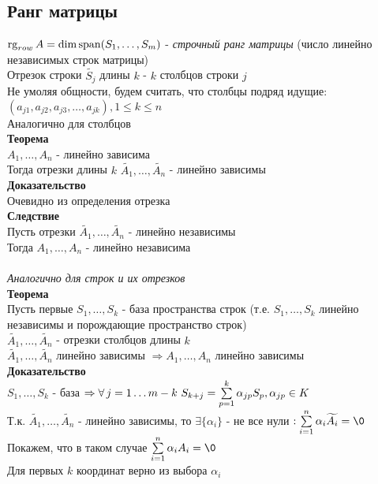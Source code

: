 \documentclass[12pt]{article}
\begin{document}
\subsection{Ранг матрицы}
$\operatorname{rg}_{row} A = \dim \operatorname{span} (S_1,\ldots,S_m)$ - \textit{строчный ранг матрицы} (число линейно независимых строк матрицы)\\
Отрезок строки $\widetilde{S_j}$ длины $k$ - $k$ столбцов строки $j$\\
Не умоляя общности, будем считать, что столбцы подряд идущие: $(a_{j1}, a_{j2}, a_{j3},\ldots,a_{jk}), 1\leq k \leq n$\\
Аналогично для столбцов\\
\textbf{Теорема}\\
$A_1,\ldots,A_n$ - линейно зависима\\
Тогда отрезки длины $k$ $\widetilde{A_1}, \ldots, \widetilde{A_n}$ - линейно зависимы\\
\textbf{Доказательство}\\
Очевидно из определения отрезка\\
\textbf{Следствие}\\
Пусть отрезки $\widetilde{A_1}, \ldots, \widetilde{A_n}$ - линейно независимы\\
Тогда $A_1,\ldots,A_n$ - линейно независима\\\\
\textit{Аналогично для строк и их отрезков}\\
\textbf{Теорема}\\
Пусть первые $S_1, \ldots, S_k$ - база пространства строк (т.е. $S_1,\ldots, S_k$ линейно независимы и порождающие пространство строк)\\
$\widetilde{A_1}, \ldots, \widetilde{A_n}$ - отрезки столбцов длины $k$\\
$\widetilde{A_1}, \ldots, \widetilde{A_n}$ линейно зависимы $\Rightarrow A_1, \ldots, A_n$ линейно зависимы\\
\textbf{Доказательство}\\
$S_1, \ldots, S_k$ - база $\Rightarrow \forall\,j=1\ldots m-k\ S_{k+j} = \suml_{p=1}^k \alpha_{jp}S_p, \alpha_{jp} \in K$\\
Т.к. $\widetilde{A_1}, \ldots, \widetilde{A_n}$ - линейно зависимы, то $\exists \{\alpha_i\}$ - не все нули $: \suml_{i=1}^n \alpha_i\widetilde{A_i} = \0$\\
Покажем, что в таком случае $\suml_{i=1}^n \alpha_i A_i = \0$\\
Для первых $k$ координат верно из выбора $\alpha_i$\\
\end{document}
